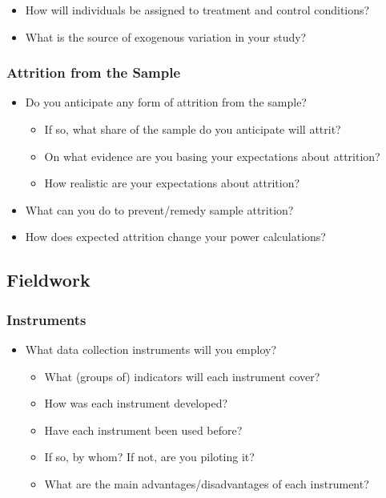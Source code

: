 \documentclass[
  letterpaper,
  DIV=11,
  numbers=noendperiod]{scrartcl}
\providecommand{\tightlist}{%
  \setlength{\itemsep}{0pt}\setlength{\parskip}{0pt}}\usepackage{longtable,booktabs,array}
\begin{document}
\begin{itemize}
\tightlist
\item
  How will individuals be assigned to treatment and control conditions?
\item
  What is the source of exogenous variation in your study?
\end{itemize}

\subsubsection{Attrition from the
Sample}\label{attrition-from-the-sample}

\begin{itemize}
\tightlist
\item
  Do you anticipate any form of attrition from the sample?

  \begin{itemize}
  \tightlist
  \item
    If so, what share of the sample do you anticipate will attrit?
  \item
    On what evidence are you basing your expectations about attrition?
  \item
    How realistic are your expectations about attrition?
  \end{itemize}
\item
  What can you do to prevent/remedy sample attrition?
\item
  How does expected attrition change your power calculations?
\end{itemize}

\subsection{Fieldwork}\label{fieldwork}

\subsubsection{Instruments}\label{instruments}

\begin{itemize}
\tightlist
\item
  What data collection instruments will you employ?

  \begin{itemize}
  \tightlist
  \item
    What (groups of) indicators will each instrument cover?
  \item
    How was each instrument developed?
  \item
    Have each instrument been used before?
  \item
    If so, by whom? If not, are you piloting it?
  \item
    What are the main advantages/disadvantages of each instrument?
  \end{itemize}
\end{itemize}
\end{document}
